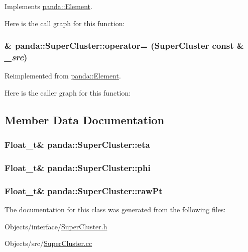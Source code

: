 Implements \hyperlink{classpanda_1_1Element_a1309a7039cde6233c19f3c488805015d}{panda::Element}.

Here is the call graph for this function:\hypertarget{classpanda_1_1SuperCluster_aba3e69a83bfcc68189c9c94e8dd36ba9}{
\subsubsection[{operator=}]{ \& panda::SuperCluster::operator= ({\bf SuperCluster} const \& {\em \_\-src})}}
\label{classpanda_1_1SuperCluster_aba3e69a83bfcc68189c9c94e8dd36ba9}


Reimplemented from \hyperlink{classpanda_1_1Element_aab6953bcc5df661a05d49fca81a0a4fc}{panda::Element}.

Here is the caller graph for this function:

\subsection{Member Data Documentation}
\hypertarget{classpanda_1_1SuperCluster_a0a4e03c8957bde5e1974d72926ff6847}{
\subsubsection[{eta}]{\setlength{\rightskip}{0pt plus 5cm}Float\_\-t\& {\bf panda::SuperCluster::eta}}}
\label{classpanda_1_1SuperCluster_a0a4e03c8957bde5e1974d72926ff6847}
\hypertarget{classpanda_1_1SuperCluster_ac71ce3d89fd68a59ff33ce10142d4908}{
\subsubsection[{phi}]{\setlength{\rightskip}{0pt plus 5cm}Float\_\-t\& {\bf panda::SuperCluster::phi}}}
\label{classpanda_1_1SuperCluster_ac71ce3d89fd68a59ff33ce10142d4908}
\hypertarget{classpanda_1_1SuperCluster_a6b6b9483d081ace5e7296cd1ddb1c41b}{
\subsubsection[{rawPt}]{\setlength{\rightskip}{0pt plus 5cm}Float\_\-t\& {\bf panda::SuperCluster::rawPt}}}
\label{classpanda_1_1SuperCluster_a6b6b9483d081ace5e7296cd1ddb1c41b}


The documentation for this class was generated from the following files:\begin{DoxyCompactItemize}
\item 
Objects/interface/\hyperlink{SuperCluster_8h}{SuperCluster.h}\item 
Objects/src/\hyperlink{SuperCluster_8cc}{SuperCluster.cc}\end{DoxyCompactItemize}
